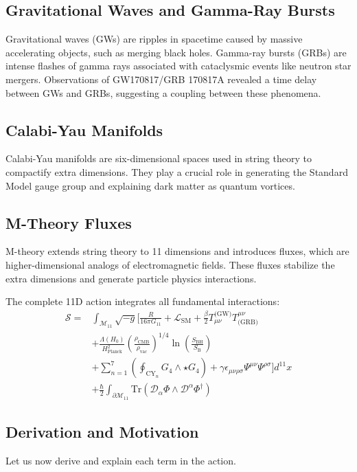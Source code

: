 \documentclass[12pt, a4paper]{article}
\begin{document}
\subsection{Gravitational Waves and Gamma-Ray Bursts}
Gravitational waves (GWs) are ripples in spacetime caused by massive accelerating objects, such as merging black holes. Gamma-ray bursts (GRBs) are intense flashes of gamma rays associated with cataclysmic events like neutron star mergers. Observations of GW170817/GRB 170817A revealed a time delay between GWs and GRBs, suggesting a coupling between these phenomena.

\subsection{Calabi-Yau Manifolds}
Calabi-Yau manifolds are six-dimensional spaces used in string theory to compactify extra dimensions. They play a crucial role in generating the Standard Model gauge group and explaining dark matter as quantum vortices.

\subsection{M-Theory Fluxes}
M-theory extends string theory to 11 dimensions and introduces fluxes, which are higher-dimensional analogs of electromagnetic fields. These fluxes stabilize the extra dimensions and generate particle physics interactions.


The complete 11D action integrates all fundamental interactions:
\[
\boxed{
\begin{aligned}
\mathcal{S} = & \int_{\mathcal{M}_{11}} \sqrt{-g} \Bigg[ \frac{R}{16\pi G_{11}} + \mathcal{L}_{\text{SM}} + \frac{\beta}{2} T_{\mu\nu}^{\text{(GW)}} T^{\mu\nu}_{\text{(GRB)}} \\
& + \frac{\Lambda(H_0)}{H_{\text{Planck}}^2} \left( \frac{\rho_{\text{CMB}}}{\rho_{\text{vac}}} \right)^{1/4} \ln\left(\frac{S_{\text{BH}}}{S_{\text{B}}}\right) \\
& + \sum_{n=1}^7 \left( \oint_{\text{CY}_n} G_4 \wedge \star G_4 \right) + \gamma \epsilon_{\mu\nu\rho\sigma} \Psi^{\mu\nu} \Psi^{\rho\sigma} \Bigg] d^{11}x \\
& + \frac{\hbar}{2} \int_{\partial\mathcal{M}_{11}} \text{Tr}\left( \mathcal{D}_\alpha \Phi \wedge \mathcal{D}^\alpha \Phi^\dagger \right)
\end{aligned}
}
\]

\subsection{Derivation and Motivation}
Let us now derive and explain each term in the action.
\end{document}
